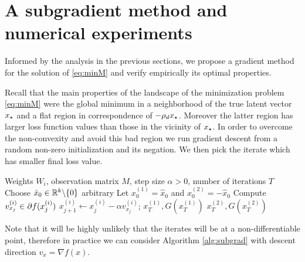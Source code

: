 \section{A subgradient method and numerical experiments}\label{subsec:algo}

Informed by the analysis in the previous sections, we propose a gradient method for the solution of \eqref{eq:minM} and verify empirically its optimal properties. 

Recall that the main properties of the landscape of the minimization problem 
\eqref{eq:minM} were the global minimum in a neighborhood of the true latent vector ${x_{\star}}$ and a flat region in correspondence of $-\rho_d {x_{\star}}$. Moreover 
the latter region has larger loss function values than those in the vicinity of ${x_{\star}}$.  In order to overcome the non-convexity and avoid this bad region we run gradient descent from a random non-zero initialization and its negation. We then pick the iterate which has smaller final loss value.

\begin{algorithm}[H]
	\caption{Gradient method for the minizimization problem \eqref{eq:minM}}\label{alg:subgrad}
	\begin{algorithmic}[1]
		 Weights $W_i$, observation matrix $M$, step size $\alpha > 0$, number of iterations $T$
		\State Choose $\hat{x}_0 \in \mathbb{R}^k \backslash \{0\}$ arbitrary
		\State Let $x_{0}^{(1)} = \hat{x}_0$ and $x_{0}^{(2)} = -\hat{x}_0$
		\State Compute $v_{{x}_{j}}^{(i)} \in \partial f({x}_{j}^{(i)})$
		\State ${x}_{j+1}^{(i)} \gets {x}_{j}^{(i)} - \alpha v_{{x}_{j}}^{(i)}$;
		\EndFor
		\EndFor
		 {$x_{T}^{(1)}, G(x_{T}^{(1)})$}
		\Else
		 {$x_{T}^{(2)}, G(x_{T}^{(2)})$}
		\EndIf
	\end{algorithmic}
\end{algorithm}


Note that it will be highly unlikely that the iterates will be at a non-differentiable point, therefore 
in practice we can consider Algorithm \ref{alg:subgrad} with descent direction $v_{x} = \nabla f(x)$.